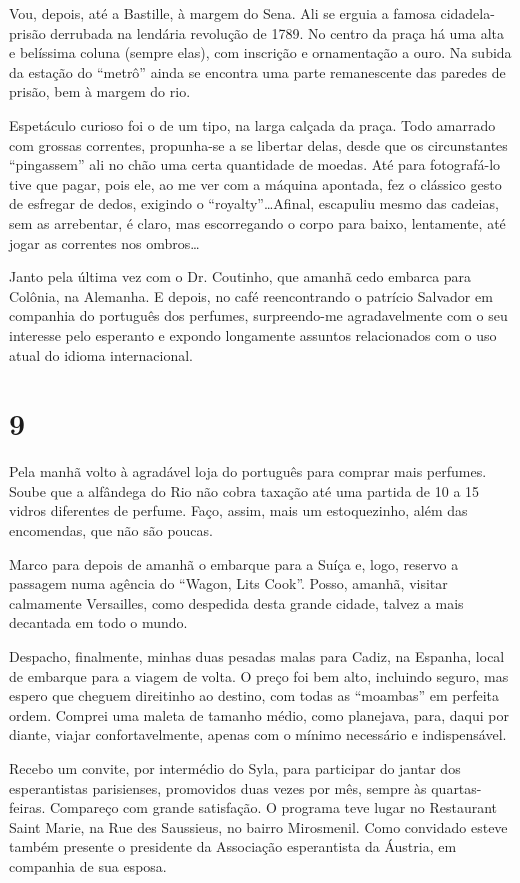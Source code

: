 Vou, depois, até a Bastille, à margem do Sena. Ali se erguia a famosa cidadela- prisão derrubada na lendária revolução de 1789. No centro da praça há uma alta e belíssima coluna (sempre elas), com inscrição e ornamentação a ouro. Na subida da estação do “metrô” ainda se encontra uma parte remanescente das paredes de prisão, bem à margem do rio.

Espetáculo curioso foi o de um tipo, na larga calçada da praça. Todo amarrado com grossas correntes, propunha-se a se libertar delas, desde que os circunstantes “pingassem” ali no chão uma certa quantidade de moedas. Até para fotografá-lo tive que pagar, pois ele, ao me ver com a máquina apontada, fez o clássico gesto de esfregar de dedos, exigindo o “royalty”\ldots Afinal, escapuliu mesmo das cadeias, sem as arrebentar, é claro, mas escorregando o corpo para baixo, lentamente, até jogar as correntes nos ombros\ldots

Janto pela última vez com o Dr. Coutinho, que amanhã cedo embarca para Colônia, na Alemanha. E depois, no café reencontrando o patrício Salvador em companhia do português dos perfumes, surpreendo-me agradavelmente com o seu interesse pelo esperanto e expondo longamente assuntos relacionados com o uso atual do idioma internacional.

\section*{9 \adfflatleafright {}}
Pela manhã volto à agradável loja do português para comprar mais perfumes. Soube que a alfândega do Rio não cobra taxação até uma partida de 10 a 15 vidros diferentes de perfume. Faço, assim, mais um estoquezinho, além das encomendas, que não são poucas.

Marco para depois de amanhã o embarque para a Suíça e, logo, reservo a passagem numa agência do “Wagon, Lits Cook”. Posso, amanhã, visitar calmamente Versailles, como despedida desta grande cidade, talvez a mais decantada em todo o mundo.

Despacho, finalmente, minhas duas pesadas malas para Cadiz, na Espanha, local de embarque para a viagem de volta. O preço foi bem alto, incluindo seguro, mas espero que cheguem direitinho ao destino, com todas as “moambas” em perfeita ordem. Comprei uma maleta de tamanho médio, como planejava, para, daqui por diante, viajar confortavelmente, apenas com o mínimo necessário e indispensável.

Recebo um convite, por intermédio do Syla, para participar do jantar dos esperantistas parisienses, promovidos duas vezes por mês, sempre às quartas-feiras. Compareço com grande satisfação. O programa teve lugar no Restaurant Saint Marie, na Rue des Saussieus, no bairro Mirosmenil. Como convidado esteve também presente o presidente da Associação esperantista da Áustria, em companhia de sua esposa.

